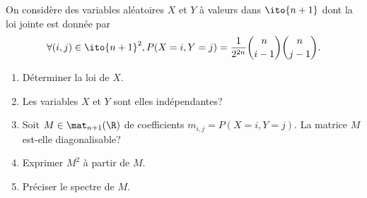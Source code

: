 \begin{enonce}
\begin{exercise}[ID={RMS130 E746},subtitle={Mines-Ponts PSI 2019},tags={}, difficulty={0}]
  On considère des variables aléatoires $X$ et $Y$ à valeurs dans $\ito{n+1}$ dont la loi jointe est donnée par
  \begin{equation*}
    \forall (i,j)\in\ito{n+1}^2, P(X=i, Y=j) = \frac{1}{2^{2n}} \binom{n}{i-1} \binom{n}{j-1}.
  \end{equation*}
\end{exercise}
\begin{enumerate}
  \item Déterminer la loi de $X$.
  \item Les variables $X$ et $Y$ sont elles indépendantes?
  \item Soit $M\in\mat_{n+1}(\R)$ de coefficients $m_{i,j}=P(X=i, Y=j)$.
    La matrice $M$ est-elle diagonalisable?
  \item Exprimer $M^2$ à partir de $M$.
  \item Préciser le spectre de $M$.
\end{enumerate}
\begin{solution}
\end{solution}
\end{enonce}
